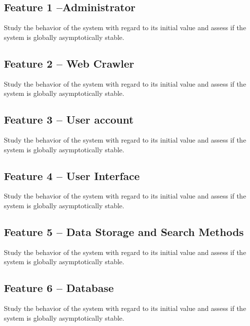 \documentclass[a4paper]{article} %
\begin{document}
\subsection*{Feature 1 --Administrator}
\label{task1:feature1}

Study the behavior of the system with regard to its initial value and assess if the system is globally asymptotically stable.

\subsection*{Feature 2 -- Web Crawler}
\label{task1:feature2}

Study the behavior of the system with regard to its initial value and assess if the system is globally asymptotically stable.

\subsection*{Feature 3 -- User account}
\label{task1:feature3}

Study the behavior of the system with regard to its initial value and assess if the system is globally asymptotically stable.

\subsection*{Feature 4 -- User Interface}
\label{task1:feature4}

Study the behavior of the system with regard to its initial value and assess if the system is globally asymptotically stable.

\subsection*{Feature 5 -- Data Storage and Search Methods}
\label{task1:feature5}

Study the behavior of the system with regard to its initial value and assess if the system is globally asymptotically stable.

\subsection*{Feature 6 -- Database}
\label{task1:feature6}

Study the behavior of the system with regard to its initial value and assess if the system is globally asymptotically stable.
\end{document}

